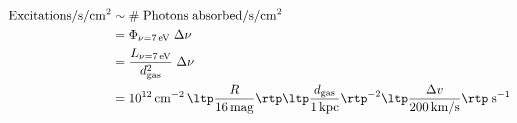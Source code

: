 \documentclass[12pt,letterpaper]{article}
\begin{document}
{\Large

{\color{Blue} 
\begin{align*}
{\rm Excitations/s/cm^2} 
        &\sim {\rm \# \; Photons \; absorbed/s/cm^2} \\
        &= \Phi_{\nu = 7\, \rm eV} \; \Delta \nu \\
        &= \frac{L_{\nu = 7\, \rm eV}}{d^2_{\rm gas}} \; \Delta \nu \\
        &= 10^{12} \, {\rm cm^{-2}} \, \ltp \frac{R}{16\,\rm mag} \rtp \ltp \frac{d_{\rm
            gas}}{1\,\rm kpc}\rtp^{-2} \ltp \frac{\Delta v}{200 \,
          \rm km/s} \rtp \; \rm s^{-1} 
\end{align*}
}


}
\end{document}
